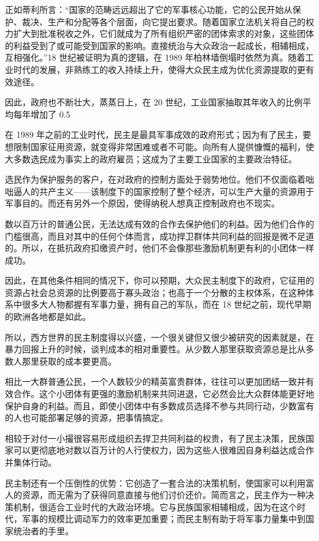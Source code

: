 正如蒂利所言：“国家的范畴远远超出了它的军事核心功能，它的公民开始从保护、裁决、生产和分配等各个层面，向它提出要求。随着国家立法机关将自己的权力扩大到批准税收之外，它们就成为了所有组织严密的团体索求的对象，这些团体的利益受到了或可能受到国家的影响。直接统治与大众政治一起成长，相辅相成，互相强化。”18 世纪被证明为真的逻辑，在 1989 年柏林墙倒塌时依然为真。随着工业时代的发展，非熟练工的收入持续上升，使得大众民主成为优化资源提取的更有效途径。

因此，政府也不断壮大，蒸蒸日上，在 20 世纪，工业国家抽取其年收入的比例平均每年增加了 0.5%

在 1989 年之前的工业时代，民主是最具军事成效的政府形式；因为有了民主，要想限制国家征用资源，就变得非常困难或者不可能。向所有人提供慷慨的福利，使大多数选民成为事实上的政府雇员；这成为了主要工业国家的主要政治特征。

选民作为保护服务的客户，在对政府的控制方面处于弱势地位。他们不仅面临着咄咄逼人的共产主义——该制度下的国家控制了整个经济，可以生产大量的资源用于军事目的。而还有另外一个原因，使得纳税人想真正控制政府也不现实。

数以百万计的普通公民，无法达成有效的合作去保护他们的利益。因为他们合作的门槛很高，而且对其中的任何个体而言，成功捍卫群体共同利益的回报是微不足道的。所以，在抵抗政府扣缴资产时，他们不会像那些激励机制更有利的小团体一样成功。

因此，在其他条件相同的情况下，你可以预期，大众民主制度下的政府，它征用的资源占社会总资源的比例要高于寡头政治；也高于一个分散的主权体系，在这种体系中很多大人物都握有军事力量，拥有自己的军队，而在 18 世纪之前，现代早期的欧洲各地都是如此。

所以，西方世界的民主制度得以兴盛，一个很关键但又很少被研究的因素就是，在暴力回报上升的时候，谈判成本的相对重要性。从少数人那里获取资源总是比从多数人那里获取的成本要更高。

相比一大群普通公民，一个人数较少的精英富贵群体，往往可以更加团结一致并有效合作。这个小团体有更强的激励机制来共同进退，它必然会比大众群体能更好地保护自身的利益。而且，即使小团体中有多数成员选择不参与共同行动，少数富有的人也可能部署足够的资源，把事情搞定。

相较于对付一小撮很容易形成组织去捍卫共同利益的权贵，有了民主决策，民族国家可以更彻底地对数以百万计的人行使权力，因为这些人很难因自身利益达成合作并集体行动。

民主制还有一个压倒性的优势：它创造了一套合法的决策机制，使国家可以利用富人的资源，而无需为了获得同意直接与他们讨价还价。简而言之，民主作为一种决策机制，很适合工业时代的大政治环境。它与民族国家相辅相成，因为在这个时代，军事的规模比调动军力的效率更加重要；而民主制有助于将军事力量集中到国家统治者的手里。

